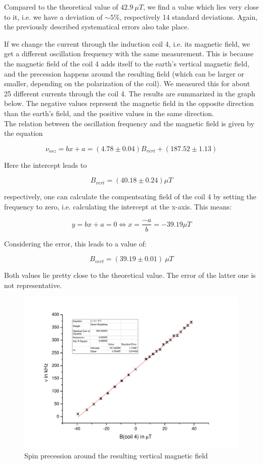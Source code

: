 Compared to the theoretical value of $42.9\ \mu T$, we find a value which lies very close to it, i.e. we have a deviation of $\sim 5\%$, respectively 14 standard deviations. Again, the previously described systematical errors also take place.

If we change the current through the induction coil 4, i.e. its magnetic field, we get a different oscillation frequency with the same measurement. This is because the magnetic field of the coil 4 adds itself to the earth's vertical magnetic field, and the precession happens around the resulting field (which can be larger or smaller, depending on the polarization of the coil).  We measured this for about 25 different currents through the coil 4. The results are summarized in the graph below. The negative values represent the magnetic field in the opposite direction than the earth's field, and the positive values in the same direction.\\

The relation between the oscillation frequency and the magnetic field is given by the equation

$$\nu_{osz} = bx + a = (4.78\pm0.04)B_{vert} + (187.52\pm1.13)$$

Here the intercept leads to

$$B_{vert} = (40.18 \pm 0.24)\mu T$$

respectively, one can calculate the compentsating field of the coil 4 by setting the frequency to zero, i.e. calculating the intercept at the x-axis. This means:

$$ y = bx + a = 0 \Leftrightarrow x = \frac{-a}{b} = -39.19 \mu T $$

Considering the error, this leads to a value of:

$$ B_{vert} = (39.19 \pm 0.01)\ \mu T $$

Both values lie pretty close to the theoretical value. The error of the latter one is not representative.

\begin{figure}[H]
\centering \includegraphics[width=1.1\textwidth]{BilderAusw/praezfeld.pdf}
\caption{Spin precession around the resulting vertical magnetic field}
\end{figure}


